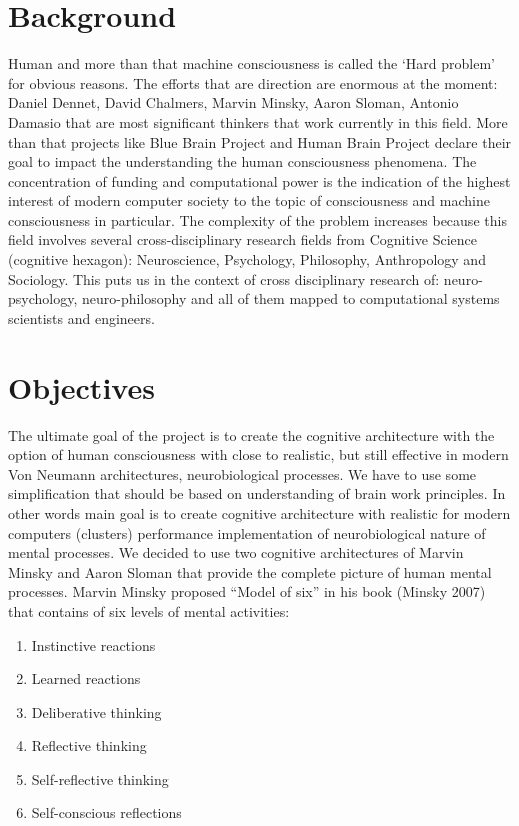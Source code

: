 \section{Background}\label{background}

Human and more than that machine consciousness is called the `Hard
problem' for obvious reasons. The efforts that are
direction are enormous at the moment: Daniel Dennet, David Chalmers,
Marvin Minsky, Aaron Sloman, Antonio Damasio that are most significant
thinkers that work currently in this field. More than that projects like
Blue Brain Project and Human Brain Project declare their goal to impact
the understanding the human consciousness phenomena. The concentration
of funding and computational power is the indication of the highest
interest of modern computer society to the topic of consciousness and
machine consciousness in particular. The complexity of the problem
increases because this field involves several cross-disciplinary
research fields from Cognitive Science (cognitive hexagon):
Neuroscience, Psychology, Philosophy, Anthropology and Sociology. This
puts us in the context of cross disciplinary research of:
neuro-psychology, neuro-philosophy and all of them mapped to
computational systems scientists and engineers.

\section{Objectives}\label{objectives}

The ultimate goal of the project is to create the cognitive architecture
with the option of human consciousness with close to realistic, but
still effective in modern Von Neumann architectures, neurobiological
processes. We have to use some simplification that should be based on
understanding of brain work principles. In other words main goal is to
create cognitive architecture with realistic for modern computers
(clusters) performance implementation of neurobiological nature of
mental processes. We decided to use two cognitive architectures of
Marvin Minsky and Aaron Sloman that provide the complete picture of
human mental processes. Marvin Minsky proposed ``Model of six'' in his
book (Minsky 2007) that contains of six levels of mental activities:

\begin{enumerate}
\def\labelenumi{\arabic{enumi}.}
\itemsep1pt\parskip0pt
\item
  Instinctive reactions
\item
  Learned reactions
\item
  Deliberative thinking
\item
  Reflective thinking
\item
  Self-reflective thinking
\item
  Self-conscious reflections
\end{enumerate}

